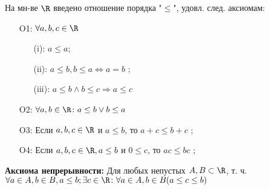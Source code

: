 На мн-ве $\R$ введено отношение порядка "$\leq$", удовл. след. аксиомам:

\begin{itemize}
    \item [O1: ] $\forall a, b, c \in \R$ 
        \begin{itemize}
            \item [(i): ] $a \leq a$;
            \item [(ii): ] $a \leq b, b \leq a \iff a = b$ ;
            \item [(iii): ]$ a \leq b \land b \leq c \Rightarrow a \leq c$
        \end{itemize}

    \item [O2: ] $\forall a, b \in \R \colon a \leq b \lor b \leq a$
    \item [O3: ] Если $a, b, c \in \R$ и $a \leq b$, то $a + c \leq b + c$ ;
    \item [O4: ] Если $a, b, c \in \R, a \leq b$ и $0 \leq c$, то $ac \leq bc$ ;
\end{itemize}

\textbf{Аксиома непрерывности: } Для любых непустых $A, B \subset \R$, т. ч. $\forall a \in A, b \in B, a \leq b; \exists c \in \R  \colon \forall a \in A, b \in B (a \leq c \leq b)$
